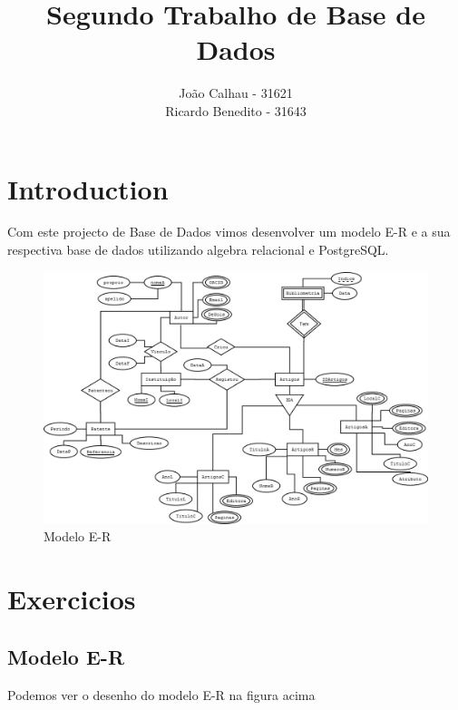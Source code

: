 \documentclass[a4paper]{article}
\title{Segundo Trabalho de Base de Dados}
\author{João Calhau - 31621 \\ Ricardo Benedito - 31643}
\begin{document}
\maketitle

\section{Introduction}
Com este projecto de Base de Dados vimos desenvolver um modelo E-R e a sua respectiva base de dados utilizando algebra relacional e PostgreSQL.

\newpage

\begin{figure}
\centering
\includegraphics[width=1\textwidth]{Diagrama1.png}
\caption{Modelo E-R}
\label{overflow}
\end{figure}

\newpage

\section{Exercicios}
\subsection{Modelo E-R}
Podemos ver o desenho do modelo E-R na figura acima

\newpage
\end{document}
